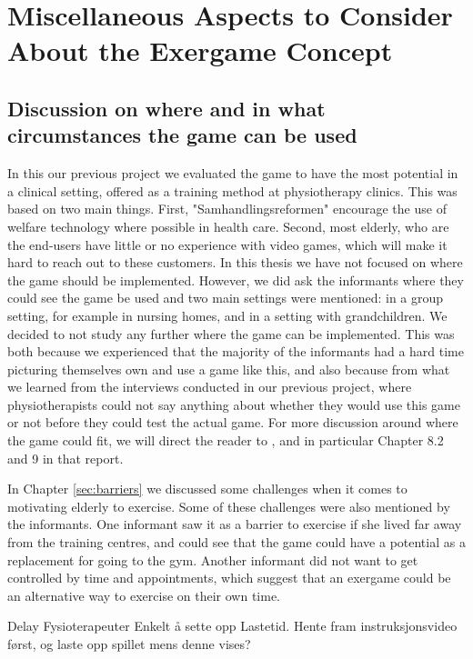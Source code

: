 \section{Miscellaneous Aspects to Consider About the Exergame Concept}
\label{sec:misc}

\subsection{Discussion on where and in what circumstances the game can be used}
\label{subsec:whatwhere}

In this our previous project \cite{project} we evaluated the game to have the most potential in a clinical setting, offered as a training method at physiotherapy clinics. This was based on two main things. First, "Samhandlingsreformen" encourage the use of welfare technology where possible in health care. Second, most elderly, who are the end-users have little or no experience with video games, which will make it hard to reach out to these customers. In this thesis we have not focused on where the game should be implemented. However, we did ask the informants where they could see the game be used and two main settings were mentioned: in a group setting, for example in nursing homes, and in a setting with grandchildren. We decided to not study any further where the game can be implemented. This was both because we experienced that the majority of the informants had a hard time picturing themselves own and use a game like this, and also because from what we learned from the interviews conducted in our previous project, where physiotherapists could not say anything about whether they would use this game or not before they could test the actual game. For more discussion around where the game could fit, we will direct the reader to \cite{project}, and in particular Chapter 8.2 and 9 in that report. 

In Chapter \ref{sec:barriers} we discussed some challenges when it comes to motivating elderly to exercise. Some of these challenges were also mentioned by the informants. One informant saw it as a barrier to exercise if she lived far away from the training centres, and could see that the game could have a potential as a replacement for going to the gym. Another informant did not want to get controlled by time and appointments, which suggest that an exergame could be an alternative way to exercise on their own time. 

Delay
Fysioterapeuter
Enkelt å sette opp
Lastetid. Hente fram instruksjonsvideo først, og laste opp spillet mens denne vises?

